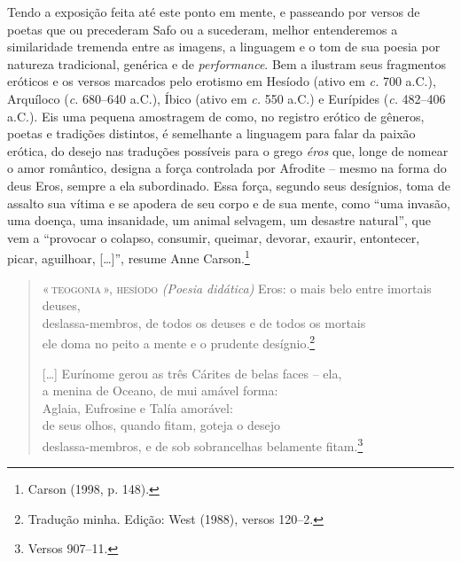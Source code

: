 Tendo a exposição feita até este ponto em mente, e passeando por versos de poetas que ou precederam Safo ou
a sucederam, melhor entenderemos a similaridade tremenda entre as imagens, a
linguagem e o tom de sua poesia por natureza tradicional, genérica e de \textit{performance}. Bem a ilustram seus fragmentos eróticos e os versos marcados pelo
erotismo em Hesíodo (ativo em \textit{c.} 700 a.C.), Arquíloco (\textit{c.} 680--640
a.C.), Íbico (ativo em \textit{c.} 550 a.C.) e Eurípides (\textit{c.} 482--406 a.C.). Eis
uma pequena amostragem de como, no registro erótico de gêneros, poetas e
tradições distintos, é semelhante a linguagem para falar da paixão erótica, do
desejo nas traduções possíveis para o grego \textit{éros} que, longe de nomear
o amor romântico, designa a força controlada por Afrodite -- mesmo na forma do
deus Eros, sempre a ela subordinado. Essa força, segundo seus desígnios, toma de
assalto sua vítima e se apodera de seu corpo e de sua mente, como “uma invasão,
uma doença, uma insanidade, um animal selvagem, um desastre natural”, que vem a
“provocar o colapso, consumir, queimar, devorar, exaurir, entontecer, picar,
aguilhoar, [\ldots{}]”, resume Anne Carson.\footnote{ Carson (1998, p. 148).}


\begin{verse}
\small{\textsc{«\,teogonia\,», hesíodo}
\textit{(Poesia didática)}
\smallskip
[\ldots{}] Eros: o mais belo entre imortais deuses,\\
deslassa-membros, de todos os deuses e de todos os mortais\\
ele doma no peito a mente e o prudente desígnio.\footnote{Tradução minha. Edição: West (1988), versos 120--2.}
\smallskip
\hspace*{35mm}
\smallskip

[\ldots{}] Eurínome gerou as três Cárites de belas faces -- ela,\\
\hspace*{2em}a menina de Oceano, de mui amável forma:\\
\hspace*{2em}Aglaia, Eufrosine e Talía amorável:\\
\hspace*{2em}de seus olhos, quando fitam, goteja o desejo\\
\hspace*{2em}deslassa-membros, e de sob sobrancelhas belamente fitam.\footnote{Versos 907--11.}}
\end{verse}

